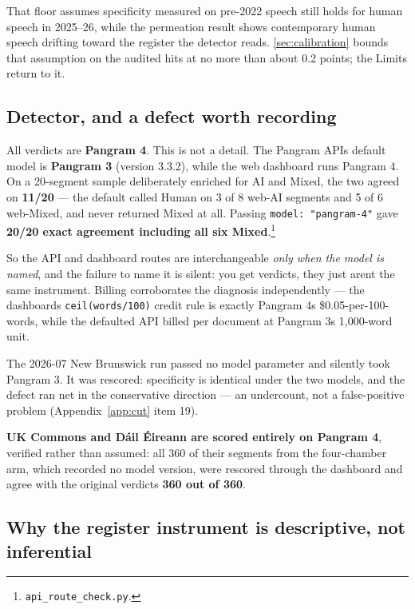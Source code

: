 That floor assumes specificity measured on pre-2022 speech still holds for human speech in 2025--26, while the permeation result shows contemporary human speech drifting toward the register the detector reads. \cref{sec:calibration} bounds that assumption on the audited hits at no more than about 0.2 points; the Limits return to it.

\subsection{Detector, and a defect worth recording}\label{sec:detector}

All verdicts are \textbf{Pangram 4}. This is not a detail. The Pangram API\textquotesingle s
default model is \textbf{Pangram 3} (version 3.3.2), while the web dashboard runs
Pangram 4. On a 20-segment sample deliberately enriched for AI and Mixed, the
two agreed on \textbf{11/20} --- the default called Human on 3 of 8 web-AI segments
and 5 of 6 web-Mixed, and never returned Mixed at all. Passing
\texttt{model:\ "pangram-4"} gave \textbf{20/20 exact agreement including all six
Mixed}.\footnote{\texttt{api\_route\_check.py}.}

So the API and dashboard routes are interchangeable \emph{only when the model is
named}, and the failure to name it is silent: you get verdicts, they just
aren\textquotesingle t the same instrument. Billing corroborates the diagnosis independently
--- the dashboard\textquotesingle s \texttt{ceil(words/100)} credit rule is exactly Pangram 4\textquotesingle s
\$0.05-per-100-words, while the defaulted API billed per document at Pangram
3\textquotesingle s 1,000-word unit.

The 2026-07 New Brunswick run passed no model parameter and silently took
Pangram 3. It was rescored: specificity is identical under the two models, and
the defect ran net in the conservative direction --- an undercount, not a
false-positive problem (Appendix~\ref{app:cut} item 19).

\textbf{UK Commons and Dáil Éireann are scored entirely on Pangram 4}, verified
rather than assumed: all 360 of their segments from the four-chamber arm, which
recorded no model version, were rescored through the dashboard and agree with
the original verdicts \textbf{360 out of 360}.

\subsection{Why the register instrument is descriptive, not inferential}\label{sec:freq-descriptive}

